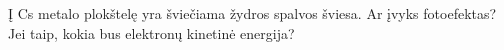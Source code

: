 \question Į Cs metalo plokštelę yra šviečiama žydros spalvos šviesa. Ar įvyks fotoefektas? Jei taip, kokia bus elektronų kinetinė energija?